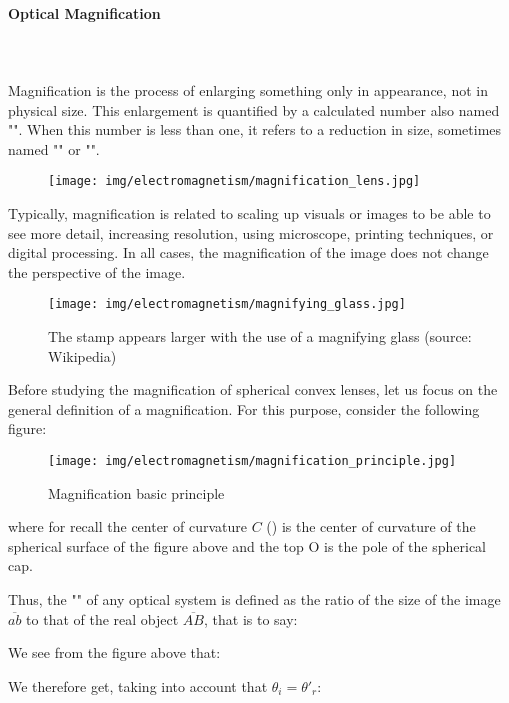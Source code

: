 	\paragraph{Optical Magnification}\mbox{}\\\\
	Magnification is the process of enlarging something only in appearance, not in physical size. This enlargement is quantified by a calculated number also named "". When this number is less than one, it refers to a reduction in size, sometimes named "" or "".
	\begin{figure}[H]
		\centering
		\texttt{[image: img/electromagnetism/magnification\_lens.jpg]}
	\end{figure}
	Typically, magnification is related to scaling up visuals or images to be able to see more detail, increasing resolution, using microscope, printing techniques, or digital processing. In all cases, the magnification of the image does not change the perspective of the image.
	\begin{figure}[H]
		\centering
		\texttt{[image: img/electromagnetism/magnifying\_glass.jpg]}
		\caption[]{The stamp appears larger with the use of a magnifying glass (source: Wikipedia)}
	\end{figure}
	Before studying the magnification of spherical convex lenses, let us focus on the general definition of a magnification. For this purpose, consider the following figure:
	\begin{figure}[H]
		\centering
		\texttt{[image: img/electromagnetism/magnification\_principle.jpg]}
		\caption[]{Magnification basic principle}
	\end{figure}
	where for recall the center of curvature $C$ () is the center of curvature of the spherical surface of the figure above and the top O is the pole of the spherical cap.

	Thus, the "" of any optical system is defined as the ratio of the size of the image $\overline{ab}$ to that of the real object $\overline{AB}$, that is to say:
	
	We see from the figure above that:
	
	We therefore get, taking into account that $\theta_i={\theta'}_r$:
	
